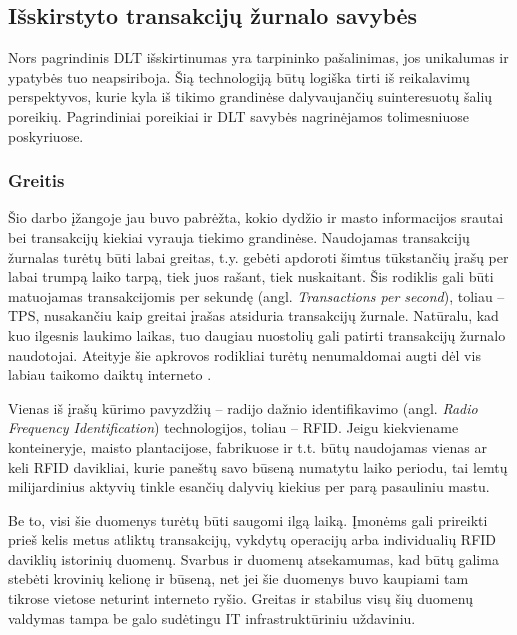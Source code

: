
\subsection{Išskirstyto transakcijų žurnalo savybės}

Nors pagrindinis DLT išskirtinumas yra tarpininko pašalinimas, jos unikalumas ir ypatybės tuo neapsiriboja. Šią technologiją būtų logiška tirti iš reikalavimų perspektyvos, kurie kyla iš tikimo grandinėse dalyvaujančių suinteresuotų šalių poreikių. Pagrindiniai poreikiai ir DLT savybės nagrinėjamos tolimesniuose poskyriuose.




\subsubsection{Greitis}

Šio darbo įžangoje jau buvo pabrėžta, kokio dydžio ir masto informacijos srautai bei transakcijų kiekiai vyrauja tiekimo grandinėse. Naudojamas transakcijų žurnalas turėtų būti labai greitas, t.y. gebėti apdoroti šimtus tūkstančių įrašų per labai trumpą laiko tarpą, tiek juos rašant, tiek nuskaitant. Šis rodiklis gali būti matuojamas transakcijomis per sekundę (angl. \textit{Transactions per second}), toliau – TPS, nusakančiu kaip greitai įrašas atsiduria transakcijų žurnale. Natūralu, kad kuo ilgesnis laukimo laikas, tuo daugiau nuostolių gali patirti transakcijų žurnalo naudotojai. Ateityje šie apkrovos rodikliai turėtų nenumaldomai augti dėl vis labiau taikomo daiktų interneto \cite{kaur2018edge}. 

Vienas iš įrašų kūrimo pavyzdžių – radijo dažnio identifikavimo (angl. \textit{Radio Frequency Identification}) technologijos, toliau – RFID. Jeigu kiekviename konteineryje, maisto plantacijose, fabrikuose ir t.t. būtų naudojamas vienas ar keli RFID davikliai, kurie paneštų savo būseną numatytu laiko periodu, tai lemtų milijardinius aktyvių tinkle esančių dalyvių kiekius per parą pasauliniu mastu.

Be to, visi šie duomenys turėtų būti saugomi ilgą laiką. Įmonėms gali prireikti prieš kelis metus atliktų transakcijų, vykdytų operacijų arba individualių RFID daviklių istorinių duomenų. Svarbus ir duomenų atsekamumas, kad būtų galima stebėti krovinių kelionę ir būseną, net jei šie duomenys buvo kaupiami tam tikrose vietose neturint interneto ryšio. Greitas ir stabilus visų šių duomenų valdymas tampa be galo sudėtingu IT infrastruktūriniu uždaviniu.

